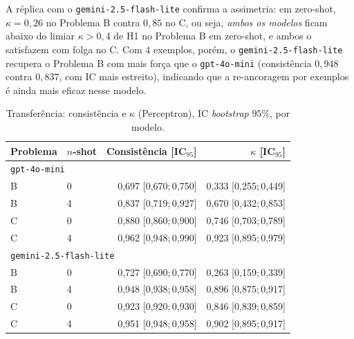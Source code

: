 \documentclass[12pt,a4paper]{article}
\begin{document}
A réplica com o \texttt{gemini-2.5-flash-lite} confirma a assimetria: em zero-shot,
$\kappa = 0{,}26$ no Problema B contra $0{,}85$ no C, ou seja, \emph{ambos os modelos}
ficam abaixo do limiar $\kappa > 0{,}4$ de H1 no Problema B em zero-shot, e ambos o
satisfazem com folga no C. Com $4$ exemplos, porém, o \texttt{gemini-2.5-flash-lite}
recupera o Problema B com mais força que o \texttt{gpt-4o-mini} (consistência $0{,}948$
contra $0{,}837$, com IC mais estreito), indicando que a re-ancoragem por exemplos é
ainda mais eficaz nesse modelo.

\begin{table}[ht]
\centering
\caption{Transferência: consistência e $\kappa$ (Perceptron), IC \emph{bootstrap} $95\%$,
por modelo.}
\label{tab:fase_bc}
\small
\begin{tabular}{llrr}
\toprule
\textbf{Problema} & \textbf{$n$-shot} & \textbf{Consistência [IC$_{95}$]} &
\textbf{$\kappa$ [IC$_{95}$]} \\
\midrule
\multicolumn{4}{l}{\texttt{gpt-4o-mini}} \\
\midrule
B & 0 & 0,697 [0,670;\,0,750] & 0,333 [0,255;\,0,449] \\
B & 4 & 0,837 [0,719;\,0,927] & 0,670 [0,432;\,0,853] \\
C & 0 & 0,880 [0,860;\,0,900] & 0,746 [0,703;\,0,789] \\
C & 4 & 0,962 [0,948;\,0,990] & 0,923 [0,895;\,0,979] \\
\midrule
\multicolumn{4}{l}{\texttt{gemini-2.5-flash-lite}} \\
\midrule
B & 0 & 0,727 [0,690;\,0,770] & 0,263 [0,159;\,0,339] \\
B & 4 & 0,948 [0,938;\,0,958] & 0,896 [0,875;\,0,917] \\
C & 0 & 0,923 [0,920;\,0,930] & 0,846 [0,839;\,0,859] \\
C & 4 & 0,951 [0,948;\,0,958] & 0,902 [0,895;\,0,917] \\
\bottomrule
\end{tabular}
\end{table}
\end{document}
